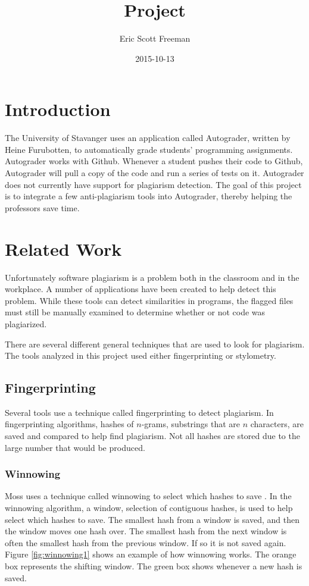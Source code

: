\documentclass[12pt]{article}
\title{Project}
\date{2015-10-13}
\author{Eric Scott Freeman}
\begin{document}
	\maketitle
	\newpage
	\tableofcontents
	\newpage
	\section{Introduction}
		The University of Stavanger uses an application called Autograder, written by Heine Furubotten, to automatically grade students' programming assignments. Autograder works with Github. Whenever a student pushes their code to Github, Autograder will pull a copy of the code and run a series of tests on it. Autograder does not currently have support for plagiarism detection. The goal of this project is to integrate a few anti-plagiarism tools into Autograder, thereby helping the professors save time.
		
	\section{Related Work}
		Unfortunately software plagiarism is a problem both in the classroom and in the workplace. A number of applications have been created to help detect this problem. While these tools can detect similarities in programs, the flagged files must still be manually examined to determine whether or not code was plagiarized.
		
		There are several different general techniques that are used to look for plagiarism. The tools analyzed in this project used either fingerprinting or stylometry.
	
		\subsection{Fingerprinting}
			Several tools use a technique called fingerprinting to detect plagiarism. In fingerprinting algorithms, hashes of $n$-grams, substrings that are $n$ characters, are saved and compared to help find plagiarism. Not all hashes are stored due to the large number that would be produced. 
		
			\subsubsection{Winnowing}
				Moss uses a technique called winnowing to select which hashes to save \cite{schleimer+wilkerson+aiken}. In the winnowing algorithm, a window, selection of contiguous hashes, is used to help select which hashes to save. The smallest hash from a window is saved, and then the window moves one hash over. The smallest hash from the next window is often the smallest hash from the previous window. If so it is not saved again. Figure \ref{fig:winnowing1} shows an example of how winnowing works. The orange box represents the shifting window. The green box shows whenever a new hash is saved.
				
\end{document}
